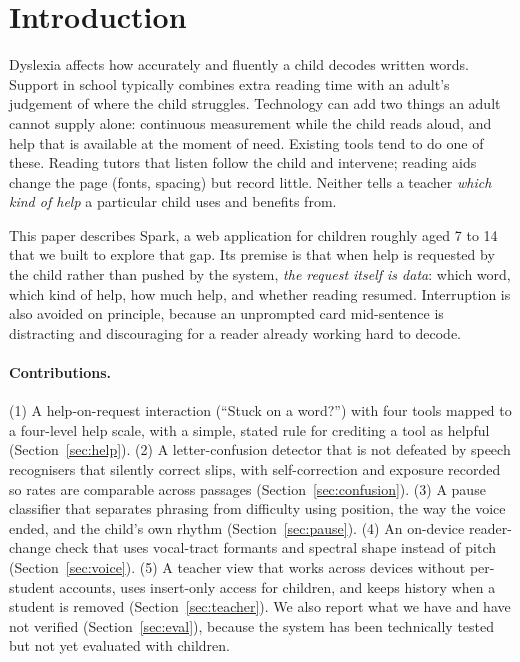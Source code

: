 \documentclass[manuscript, screen, review, anonymous]{acmart}
\begin{document}


\maketitle

\section{Introduction}
Dyslexia affects how accurately and fluently a child decodes written words. Support in school typically combines extra reading time with an adult's judgement of where the child struggles. Technology can add two things an adult cannot supply alone: continuous measurement while the child reads aloud, and help that is available at the moment of need. Existing tools tend to do one of these. Reading tutors that listen \cite{mostow2001listen} follow the child and intervene; reading aids change the page (fonts, spacing) \cite{rello2016font,zorzi2012spacing} but record little. Neither tells a teacher \emph{which kind of help} a particular child uses and benefits from.

This paper describes Spark, a web application for children roughly aged 7 to 14 that we built to explore that gap. Its premise is that when help is requested by the child rather than pushed by the system, \emph{the request itself is data}: which word, which kind of help, how much help, and whether reading resumed. Interruption is also avoided on principle, because an unprompted card mid-sentence is distracting and discouraging for a reader already working hard to decode.

\paragraph{Contributions.} (1) A help-on-request interaction (``Stuck on a word?'') with four tools mapped to a four-level help scale, with a simple, stated rule for crediting a tool as helpful (Section~\ref{sec:help}). (2) A letter-confusion detector that is not defeated by speech recognisers that silently correct slips, with self-correction and exposure recorded so rates are comparable across passages (Section~\ref{sec:confusion}). (3) A pause classifier that separates phrasing from difficulty using position, the way the voice ended, and the child's own rhythm (Section~\ref{sec:pause}). (4) An on-device reader-change check that uses vocal-tract formants and spectral shape instead of pitch (Section~\ref{sec:voice}). (5) A teacher view that works across devices without per-student accounts, uses insert-only access for children, and keeps history when a student is removed (Section~\ref{sec:teacher}). We also report what we have and have not verified (Section~\ref{sec:eval}), because the system has been technically tested but not yet evaluated with children.
\end{document}
